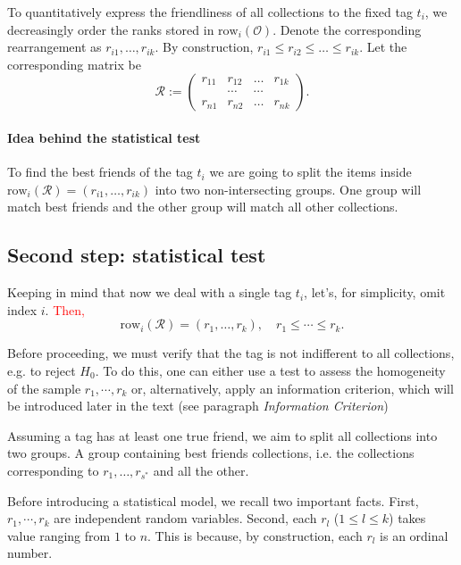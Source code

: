 \documentclass{llncs}
\begin{document}
To quantitatively express the friendliness of all collections to the fixed tag $t_i$, we decreasingly order the ranks stored in $\text{row}_i(\mathcal{O})$. Denote the corresponding rearrangement as $r_{i1}, \dots, r_{ik}$. By construction, $r_{i1} \le r_{i2} \le \dots \le r_{ik}$. Let the corresponding matrix be
\begin{equation}
\label{def:R}
\mathcal{R} := \begin{pmatrix}
r_{11} & r_{12} & \dots & r_{1k} \\
 &\cdots & \cdots & \\
r_{n1} & r_{n2} & \dots & r_{nk}
\end{pmatrix}.
\end{equation}
\paragraph{Idea behind the statistical test} To find the best friends of the tag $t_i$ we are going to split the items inside $\text{row}_{i}(\mathcal{R}) = (r_{i1}, \dots, r_{ik})$ into two non-intersecting groups. One group will match best friends and the other group will match all other collections. 

\subsection*{Second step: statistical test}
Keeping in mind that now we deal with a single tag $t_i$, let's, for simplicity, omit index $i$. \textcolor{red}{Then,} 
\[
\text{row}_{i}(\mathcal{R}) = (r_{1}, \dots, r_{k}), 
\quad
r_{1} \le \cdots \le r_{k}.
\]

Before proceeding, we must verify that the tag is not indifferent to all collections, e.g. to reject $H_0$. To do this, one can either use a test to assess the homogeneity of the sample $r_{1}, \cdots, r_{k}$ or, alternatively, apply an information criterion, which will be introduced later in the text (see paragraph \textit{Information Criterion})

Assuming a tag has at least one true friend, we aim to split all collections into two groups. A group containing best friends collections, i.e. the collections corresponding to $r_1, \dots, r_{s^*}$ and all the other.

Before introducing a statistical model, we recall two important facts. First, $r_{1}, \cdots, r_{k}$ are independent random variables. Second, each $r_l$ ($1\le l \le k$) takes value ranging from $1$ to $n$. This is because, by construction, each $r_l$ is an ordinal number.
\end{document}
